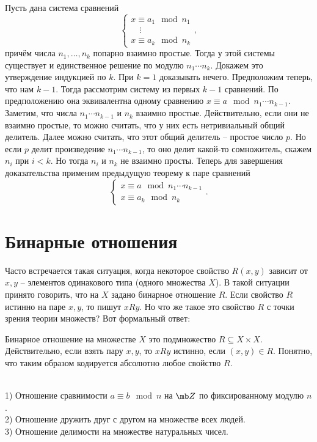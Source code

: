 \thrm Пусть дана система сравнений
$$ \begin{cases}
x\equiv a_1 \mod n_1\\
\,\,\,\,\,\,\vdots\\
x\equiv a_k \mod n_k
\end{cases},$$
причём числа $n_1,\dots,n_k$ попарно взаимно простые. Тогда у этой системы существует и единственное решение по модулю $n_1\cdots n_k$.
\ethrm
\proof
Докажем это утверждение индукцией по $k$. При $k=1$ доказывать нечего. Предположим теперь, что нам $k-1$. Тогда рассмотрим систему из первых $k-1$ сравнений. По предположению она эквивалентна одному сравнению $x\equiv a \mod n_1\cdots n_{k-1}$. Заметим, что числа $n_1\cdots n_{k-1}$ и $n_k$ взаимно простые. Действительно, если они не взаимно простые, то можно считать, что у них есть нетривиальный общий делитель. Далее можно считать, что этот общий делитель -- простое число $p$. Но если $p$ делит произведение $n_1\cdots n_{k-1}$, то оно делит какой-то сомножитель, скажем $n_i$ при $i<k$. Но тогда $n_i$ и $n_k$ не взаимно просты.
Теперь для завершения доказательства применим предыдущую теорему к паре сравнений
$$ \begin{cases}
x\equiv a \mod n_1\cdots n_{k-1}\\
x\equiv a_k \mod n_k
\end{cases}.$$

\endproof

\section{Бинарные отношения}


Часто встречается такая ситуация, когда некоторое свойство $R(x,y)$ зависит от $x,y$ -- элементов одинакового типа (одного множества $X$). В такой ситуации принято говорить, что на $X$ задано бинарное отношение $R$. Если свойство $R$ истинно на паре $x,y$, то пишут $x R y$. Но что же такое это свойство $R$ с точки зрения теории множеств? Вот формальный ответ:

\dfn Бинарное отношение на множестве $X$ это подмножество $R \subseteq X\times X$.
\edfn
Действительно, если взять пару $x,y$, то $x R y$ истинно, если $(x,y)\in R$. Понятно, что таким образом кодируется абсолютно любое свойство $R$.

\exm \\
1) Отношение сравнимости $a\equiv b \mod n$ на $\mb Z$ по фиксированному модулю $n$.\\
2) Отношение дружить друг с другом на множестве всех людей.\\
3) Отношение делимости на множестве натуральных чисел.\\


